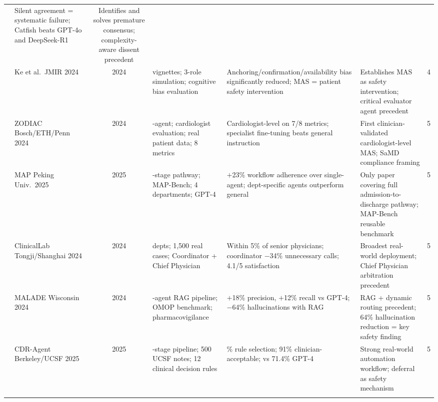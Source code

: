 \begin{table}[p]
\begin{adjustbox}{max width=\textwidth, max totalheight=0.93\textheight, keepaspectratio}
\begin{tabular}{%
  c
  >{\raggedright\arraybackslash}p{2.4cm}
  c
  >{\raggedright\arraybackslash}p{3.5cm}
  >{\raggedright\arraybackslash}p{3.9cm}
  >{\raggedright\arraybackslash}p{3.4cm}
  c}
  & Silent agreement = systematic failure; Catfish beats GPT-4o and DeepSeek-R1
  & Identifies and solves premature consensus; complexity-aware dissent precedent
  & 5 \\[3pt]
\cite{Ke2024CognitiveBias}
  & Ke et al.\ \newline JMIR 2024
  & 2024
  & 10 vignettes; 3-role simulation; cognitive bias evaluation
  & Anchoring/confirmation/availability bias significantly reduced; MAS = patient safety intervention
  & Establishes MAS as safety intervention; critical evaluator agent precedent
  & 4 \\[3pt]
\cite{Zhou2024ZODIAC}
  & ZODIAC \newline Bosch/ETH/Penn 2024
  & 2024
  & 5-agent; cardiologist evaluation; real patient data; 8 metrics
  & Cardiologist-level on 7/8 metrics; specialist fine-tuning beats general instruction
  & First clinician-validated cardiologist-level MAS; SaMD compliance framing
  & 5 \\[3pt]
\cite{Chen2025MAP}
  & MAP \newline Peking Univ.\ 2025
  & 2025
  & 5-stage pathway; MAP-Bench; 4 departments; GPT-4
  & $+$23\% workflow adherence over single-agent; dept-specific agents outperform general
  & Only paper covering full admission-to-discharge pathway; MAP-Bench reusable benchmark
  & 5 \\[3pt]
\cite{Yan2024ClinicalLab}
  & ClinicalLab \newline Tongji/Shanghai 2024
  & 2024
  & 11 depts; 1{,}500 real cases; Coordinator + Chief Physician
  & Within 5\% of senior physicians; coordinator $-$34\% unnecessary calls; 4.1/5 satisfaction
  & Broadest real-world deployment; Chief Physician arbitration precedent
  & 5 \\[3pt]
\cite{Choi2024MALADE}
  & MALADE \newline Wisconsin 2024
  & 2024
  & 4-agent RAG pipeline; OMOP benchmark; pharmacovigilance
  & $+$18\% precision, $+$12\% recall vs GPT-4; $-$64\% hallucinations with RAG
  & RAG + dynamic routing precedent; 64\% hallucination reduction = key safety finding
  & 5 \\[3pt]
\cite{Xiang2025CDRAgent}
  & CDR-Agent \newline Berkeley/UCSF 2025
  & 2025
  & 4-stage pipeline; 500 UCSF notes; 12 clinical decision rules
  & 94.2\% rule selection; 91\% clinician-acceptable; vs 71.4\% GPT-4
  & Strong real-world automation workflow; deferral as safety mechanism
  & 5 \\[3pt]
\cite{Lu2024TriageAgent}

\end{tabular}
\end{adjustbox}
\end{table}
